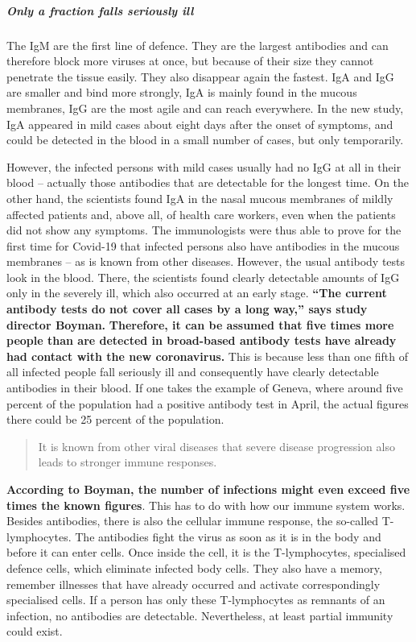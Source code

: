 \hypertarget{only-a-fraction-falls-seriously-ill}{%
\subparagraph{\texorpdfstring{\textbf{Only a fraction falls seriously
ill}}{Only a fraction falls seriously ill}}\label{only-a-fraction-falls-seriously-ill}}

The IgM are the first line of defence. They are the largest antibodies
and can therefore block more viruses at once, but because of their size
they cannot penetrate the tissue easily. They also disappear again the
fastest. IgA and IgG are smaller and bind more strongly, IgA is mainly
found in the mucous membranes, IgG are the most agile and can reach
everywhere. In the new study, IgA appeared in mild cases about eight
days after the onset of symptoms, and could be detected in the blood in
a small number of cases, but only temporarily.

However, the infected persons with mild cases usually had no IgG at all
in their blood -- actually those antibodies that are detectable for the
longest time. On the other hand, the scientists found IgA in the nasal
mucous membranes of mildly affected patients and, above all, of health
care workers, even when the patients did not show any symptoms. The
immunologists were thus able to prove for the first time for Covid-19
that infected persons also have antibodies in the mucous membranes -- as
is known from other diseases. However, the usual antibody tests look in
the blood. There, the scientists found clearly detectable amounts of IgG
only in the severely ill, which also occurred at an early stage.
\textbf{``The current antibody tests do not cover all cases by a long
way,'' says study director Boyman.} \textbf{Therefore, it can be assumed
that five times more people than are detected in broad-based antibody
tests have already had contact with the new coronavirus.} This is
because less than one fifth of all infected people fall seriously ill
and consequently have clearly detectable antibodies in their blood. If
one takes the example of Geneva, where around five percent of the
population had a positive antibody test in April, the actual figures
there could be 25 percent of the population.

\begin{quote}
It is known from other viral diseases that severe disease progression
also leads to stronger immune responses.
\end{quote}

\textbf{According to Boyman, the number of infections might even exceed
five times the known figures}. This has to do with how our immune system
works. Besides antibodies, there is also the cellular immune response,
the so-called T-lymphocytes. The antibodies fight the virus as soon as
it is in the body and before it can enter cells. Once inside the cell,
it is the T-lymphocytes, specialised defence cells, which eliminate
infected body cells. They also have a memory, remember illnesses that
have already occurred and activate correspondingly specialised cells. If
a person has only these T-lymphocytes as remnants of an infection, no
antibodies are detectable. Nevertheless, at least partial immunity could
exist.

